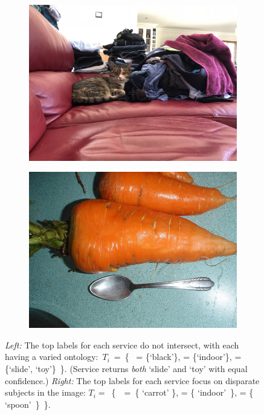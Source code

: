 \begin{figure}[t]
  \centering
  \begin{subfigure}[b]{0.49\linewidth}
    \centering
    \includegraphics[width=.8\linewidth]{cat_1}  
    \caption{}
    \label{icsme2019:fig:sample-images:cat}
  \end{subfigure}
  \hfill
  \begin{subfigure}[b]{0.49\linewidth}
    \centering
    \includegraphics[width=.8\linewidth]{000000196009} 
    \caption{}
    \label{icsme2019:fig:sample-images:carrot}
  \end{subfigure}
  \caption[Top labels for images between CV services do not intersect]{
    \textit{Left:} The top labels for each service do not intersect, with each having a varied ontology:~$T_{i}$~=~\{~\googleapi{} = \{`black'\}, \azureapi{} = \{`indoor'\}, \awsapi{} = \{`slide', `toy'\}~\}. (Service \awsapi{} returns \textit{both} `slide' and `toy' with equal confidence.)
    \textit{Right:} The top labels for each service focus on disparate subjects in the image: $T_{i} = $~\{~\googleapi{}~=~\{ `carrot' \}, \azureapi{} = \{ `indoor'~\}, \awsapi{} = \{ `spoon'~\}~\}.
    }
\end{figure}

